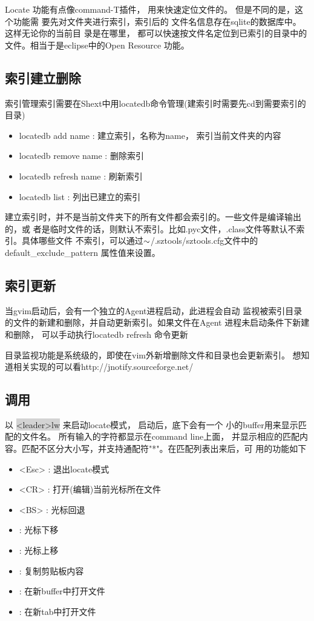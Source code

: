 \documentclass[oneside,openany]{book}
\begin{document}
    Locate 功能有点像command-T插件， 用来快速定位文件的。 但是不同的是，这个功能需
要先对文件夹进行索引，索引后的 文件名信息存在sqlite的数据库中。 这样无论你的当前目
录是在哪里， 都可以快速按文件名定位到已索引的目录中的文件。相当于是eclipse中的Open Resource
功能。

\subsection{索引建立删除}
  索引管理索引需要在Shext中用locatedb命令管理(建索引时需要先cd到需要索引的目录) 
  \begin{itemize}
      \item locatedb add name : 建立索引，名称为name， 索引当前文件夹的内容
      \item locatedb remove name : 删除索引
      \item locatedb refresh name : 刷新索引
      \item locatedb list : 列出已建立的索引 
  \end{itemize}

  建立索引时，并不是当前文件夹下的所有文件都会索引的。一些文件是编译输出的，或
者是临时文件的话，则默认不索引。比如.pyc文件，.class文件等默认不索引。具体哪些文件
不索引，可以通过$\tiny{\sim}$/.sztools/sztools.cfg文件中的default\_exclude\_pattern
属性值来设置。

\subsection{索引更新}
    当gvim启动后，会有一个独立的Agent进程启动，此进程会自动
监视被索引目录的文件的新建和删除，并自动更新索引。如果文件在Agent
进程未启动条件下新建和删除， 可以手动执行locatedb refresh 命令更新

   目录监视功能是系统级的，即使在vim外新增删除文件和目录也会更新索引。
想知道相关实现的可以看http://jnotify.sourceforge.net/

\subsection{调用}
   以 \colorbox{lightgray}{<leader>lw} 来启动locate模式， 启动后，底下会有一个
小的buffer用来显示匹配的文件名。 所有输入的字符都显示在command line上面，
并显示相应的匹配内容。匹配不区分大小写，并支持通配符"*"。在匹配列表出来后，可
用的功能如下
    \begin{itemize}
        \item <Esc> : 退出locate模式
        \item <CR>  : 打开(编辑)当前光标所在文件 
        \item <BS>  : 光标回退
        \item <C-j> : 光标下移
        \item <C-k> : 光标上移
        \item <C-v> : 复制剪贴板内容
        \item <C-b> : 在新buffer中打开文件
        \item <C-t> : 在新tab中打开文件
    \end{itemize}
    
\end{document}
